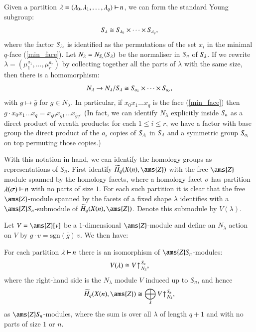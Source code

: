 \documentclass[matann2]{svjour1}
\def\Z{\ams{Z}}
\def\symn{S_{\kern-1pt n}}
\def\ra{\rightarrow}
\def\Ind{\mathrm{Ind}}
\def\partition{\,\,\begin{tikzpicture}
\draw[line width=0.7pt](0,0)--(0,0.2);
\draw[line width=0.7pt](0,0.1)--(0.175,0.1);
\end{tikzpicture}\,}
\newcommand{\Sym}[1]{S_{\kern-1pt {#1}}}
\begin{document}
Given a partition 
$\lambda = (\lambda_0,\lambda_1,\ldots,\lambda_{q})\partition n$,
we can form the standard Young subgroup: 
$$
\Sym{\lambda}
\cong
\Sym{\lambda_{0}}
\times \cdots\times
\Sym{\lambda_{q}},
$$
where the factor  
$\Sym{\lambda_i}$
is identified as the permutations of the set 
$x_i$ in the minimal $q$-face (\ref{min_face}).
Let $N_\lambda = N_{\symn}(\Sym{\lambda})$ be the normaliser 
in $\symn$ of $\Sym{\lambda}$. 
If we rewrite $\lambda = \left(\mu_1^{a_1},\ldots,\mu_r^{a_r}\right)$ 
by collecting together all the parts of $\lambda$ with the 
same size, then there is a homomorphism:
$$
N_\lambda \ra N_\lambda/\Sym{\lambda} \cong \Sym{a_1}\times \cdots \times \Sym{a_r},
$$
with $g\mapsto \bar{g}$ for $g\in N_\lambda$. In particular, if 
$x_0x_1\ldots x_q$ is the face (\ref{min_face})
then
$g\cdot x_0x_1\ldots x_q=x_{\bar{g} 0}x_{\bar{g} 1}\ldots x_{\bar{g}q}$.
(In fact, we can identify $N_\lambda$ explicitly inside $\symn$ as a 
direct product of wreath products: for each $1\leq i\leq r$, we 
have a factor with base group the direct product of the $a_i$ copies
of $\Sym{\lambda_i}$ in $\Sym{\lambda}$ and a symmetric group $\Sym{a_i}$
on top permuting those copies.)

With this notation in hand, we can identify the homology groups as 
representations of $\Sym{n}$.
First identify $\widetilde{H}_q(X(n),\Z)$ with 
the free $\Z$-module spanned by the homology facets, where 
a homology facet $\sigma$ %
has partition 
$\lambda(\sigma)\partition n$ with no parts of size $1$. 
For each such partition %
it is clear that the free $\Z$-module spanned by the facets of 
a fixed shape $\lambda$ identifies with a $\Z\symn$-submodule of 
$\widetilde{H}_q(X(n),\Z)$. 
Denote this submodule by $V(\lambda)$.

Let $V=\Z[v]$ be a $1$-dimensional $\Z$-module and define an
$N_\lambda$ action on $V$ by $g\cdot v=\text{sgn}(\bar{g})\, v$.
We then have:

\begin{theorem}
  \label{thm:homologyinduced}
For each partition $\lambda\partition n$
there is an isomorphism of 
$\Z\symn$-modules:
$$
V(\lambda) \cong
V\kern1pt{\uparrow^{\kern1pt\Sym{n}}_{\kern1ptN_\lambda}},
$$
where the right-hand side is the $N_\lambda$ module $V$ induced 
up to $\Sym{n}$,
and hence
$$
\widetilde{H}_q(X(n),\Z) \cong \bigoplus_\lambda 
V\kern1pt{\uparrow^{\kern1pt\Sym{n}}_{\kern1ptN_\lambda}},
$$
as $\Z\symn$-modules,
where the sum is over all $\lambda$ of length $q+1$ and with no parts
of size $1$ or $n$.
\end{theorem}
\end{document}
